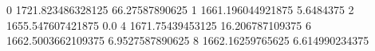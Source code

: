 0 1721.823486328125 66.27587890625
1 1661.196044921875 5.6484375
2 1655.547607421875 0.0
4 1671.75439453125 16.206787109375
6 1662.5003662109375 6.9527587890625
8 1662.16259765625 6.614990234375
